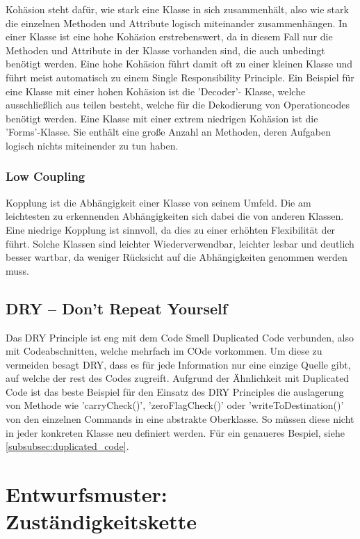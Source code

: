 \documentclass[12pt,a4paper,titlepage,ngerman,pdftex]{report}
\begin{document}
    Kohäsion steht dafür, wie stark eine Klasse in sich zusammenhält, also wie stark die einzelnen Methoden und Attribute logisch miteinander zusammenhängen. In einer Klasse ist eine hohe Kohäsion erstrebenswert, da in diesem Fall nur die Methoden und Attribute in der Klasse vorhanden sind, die auch unbedingt benötigt werden.
    Eine hohe Kohäsion führt damit oft zu einer kleinen Klasse und führt meist automatisch zu einem Single Responsibility Principle. Ein Beispiel für eine Klasse mit einer hohen Kohäsion ist die 'Decoder'- Klasse, welche ausschließlich aus teilen besteht, welche für die Dekodierung von Operationcodes benötigt werden. 
    Eine Klasse mit einer extrem niedrigen Kohäsion ist die 'Forms'-Klasse. Sie enthält eine große Anzahl an Methoden, deren Aufgaben logisch nichts miteinender zu tun haben.  

    \subsubsection{Low Coupling}
    
    Kopplung ist die Abhängigkeit einer Klasse von seinem Umfeld. Die am leichtesten zu erkennenden Abhängigkeiten sich dabei die von anderen Klassen. Eine niedrige Kopplung ist sinnvoll, da dies zu einer erhöhten Flexibilität der führt. Solche Klassen sind leichter Wiederverwendbar, leichter lesbar und deutlich besser wartbar, da weniger Rücksicht auf die Abhängigkeiten genommen werden muss. 

    
    \subsection{DRY -- Don't Repeat Yourself}
    Das DRY Principle ist eng mit dem Code Smell Duplicated Code verbunden, also mit Codeabschnitten, welche mehrfach im COde vorkommen. Um diese zu vermeiden besagt DRY, dass es für jede Information nur eine einzige Quelle gibt, auf welche der rest des Codes zugreift.
    Aufgrund der Ähnlichkeit mit Duplicated Code ist das beste Beispiel für den Einsatz des DRY Principles die auslagerung von Methode wie 'carryCheck()', 'zeroFlagCheck()' oder 'writeToDestination()' von den einzelnen Commands in eine abstrakte Oberklasse. So müssen diese nicht in jeder konkreten Klasse neu definiert werden. Für ein genaueres Bespiel, siehe \autoref{subsubsec:duplicated_code}.  

    \section{Entwurfsmuster: Zuständigkeitskette}\label{sec:entwurfsmuster}
\end{document}
